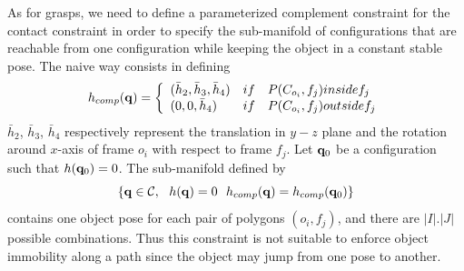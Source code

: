 As for grasps, we need to define a parameterized complement constraint for the contact constraint in order to specify the sub-manifold of configurations that are reachable from one configuration while keeping the object in a constant stable pose. The naive way consists in defining
$$
h_{comp}(\mathbf{q}) = \left\{\begin{array}{lll}(\bar{h}_2,\bar{h}_3,\bar{h}_4)&
\relax{if} & P(C_{o_i},f_j)\relax{ inside } f_j\\
(0,0,\bar{h}_4)&
\relax{if} & P(C_{o_i},f_j)\relax{ outside } f_j\end{array}\right.
$$
$\bar{h}_2$, $\bar{h}_3$, $\bar{h}_4$ respectively represent the translation in $y-z$ plane and the rotation around $x$-axis of frame $o_i$ with respect to frame $f_j$. Let $\mathbf{q}_0$ be a configuration such that $h(\mathbf{q}_0)=0$. The sub-manifold defined by
\begin{equation}\label{eq:stable-pose}
\left\{\conf\in\CS,\ \ h(\conf)=0\ \ h_{comp}(\conf) = h_{comp}(\conf_0) \right\}
\end{equation}
contains one object pose for each pair of polygons $(o_i,f_j)$, and there are
$|I| . |J|$ possible combinations. Thus this constraint is not suitable to
enforce object immobility along a path since the object may jump from one pose to another.

